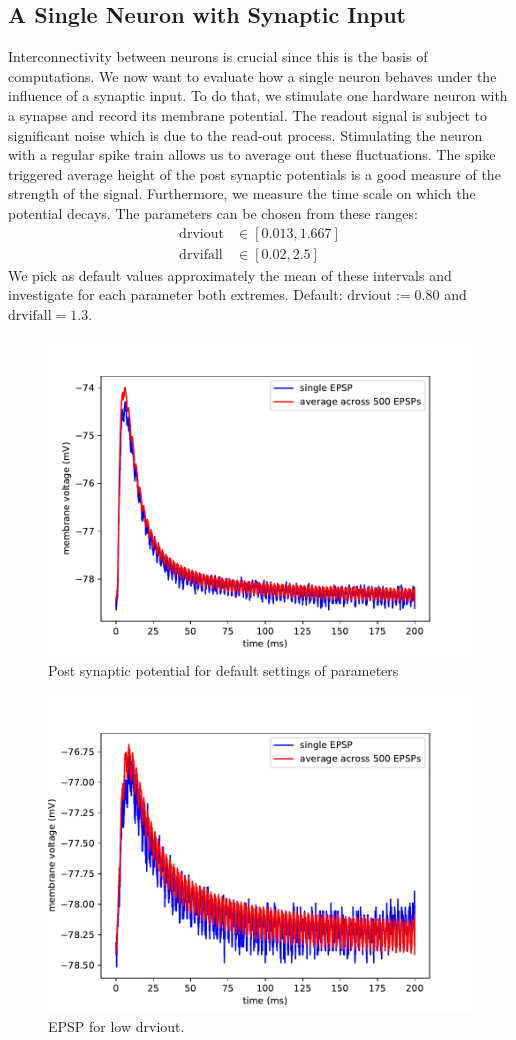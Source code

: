 \documentclass[a4paper,twocolumn]{article}
\begin{document}
\subsection{A Single Neuron with Synaptic Input}
Interconnectivity between neurons is crucial since this is the basis of 
computations.  We now want to evaluate how a single neuron behaves under the influence
 of a synaptic input.  To do that,  we stimulate one hardware neuron with a synapse 
 and record its membrane potential.  The readout signal is subject to significant 
 noise which is due to the read-out process.  Stimulating the neuron with a regular 
 spike train allows us to average out these fluctuations.  The spike triggered average 
 height of the post synaptic potentials is a good measure of the strength of the signal.  
 Furthermore,  we measure the time scale on which the potential decays.  
The parameters can be chosen from these ranges:
\begin{align*}
	\text{drviout} &\in \left[ 0.013, 1.667  \right] \\
	\text{drvifall} &\in \left[ 0.02,  2.5  \right] 
\end{align*}
We pick as default values approximately the mean of these intervals and 
investigate for each parameter both extremes.  Default: $\text{drviout} := 0.80$ 
and $\text{drvifall}=1.3$.  
\begin{figure}[ht]
    \centering
    \includegraphics[width=.5\textwidth]{figures/epsp_default.pdf}
    \caption{Post synaptic potential for default settings of parameters}
    \label{fig:feed-forward}
\end{figure}
\begin{figure}[ht]
    \centering
    \includegraphics[width=.5\textwidth]{figures/epsp_out_-.pdf}
    \caption{EPSP for low drviout.}
    \label{fig:feed-forward}
\end{figure}
\end{document}

